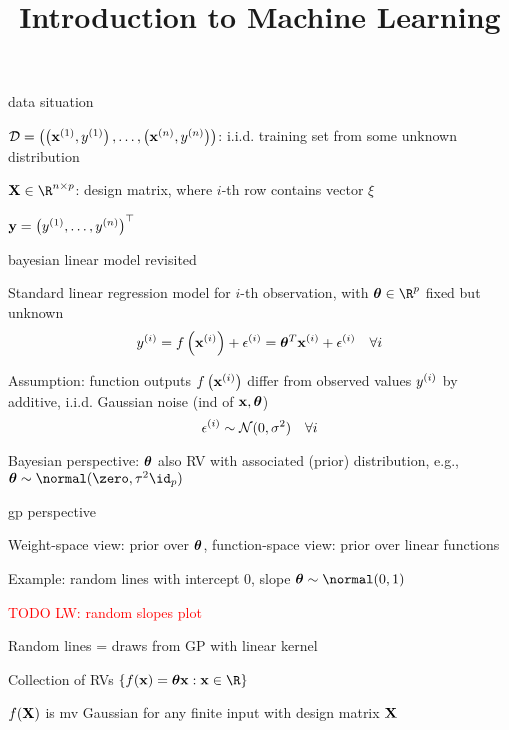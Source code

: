 \documentclass[11pt,compress,t,notes=noshow, xcolor=table]{beamer}
\title{Introduction to Machine Learning}
\begin{document}


\begin{framei}{data situation}
\item $\mathcal{D} = \left( \left(\mathbf{x}^{(1)}, y^{(1)}\right), \ldots, \left(\mathbf{x}^{(n)}, y^{(n)}\right)\right)$: i.i.d. training set from some unknown distribution
\item $\Xmat \in \R^{n \times p}$: design matrix, where $i$-th row contains vector $\xi$
\item $\mathbf{y} = \left(y^{(1)}, \hdots, y^{(n)}\right)^\top$
\end{framei}

\begin{framei}[sep=L]{bayesian linear model revisited}
\item Standard linear regression model for $i$-th observation, with $\thetav \in \R^p$ fixed but unknown
$$y^{(i)} = f\left(\mathbf{x}^{(i)}\right) + \epsilon^{(i)} = \bm{\theta}^T \mathbf{x}^{(i)} + \epsilon^{(i)} \quad \forall i$$
\item Assumption: function outputs $f\left(\mathbf{x}^{(i)}\right)$ differ from observed values $y^{(i)}$ by additive, i.i.d. Gaussian noise (ind of $\mathbf{x}, \bm{\theta}$)
$$\epsilon^{(i)} \sim \mathcal{N}(0, \sigma^2) \quad \forall i$$ 
\item Bayesian perspective: $\bm{\theta}$ also RV with associated (prior) distribution, e.g., $\thetav \sim \normal(\zero, \tau^2 \id_p)$
\end{framei}

\begin{framei}{gp perspective}
\item Weight-space view: prior over $\bm{\theta}$, function-space view: prior over linear functions
\item Example: random lines with intercept 0, slope $\thetav \sim \normal(0, 1)$

\textcolor{red}{TODO LW: random slopes plot}
\item Random lines = draws from GP with linear kernel
\item Collection of RVs $\{ \fx = \thetav \xv: \xv \in \R\}$\item $f(\mathbf{X})$ is mv Gaussian for any finite input with design matrix $\mathbf{X}$
\end{framei}
\end{document}

